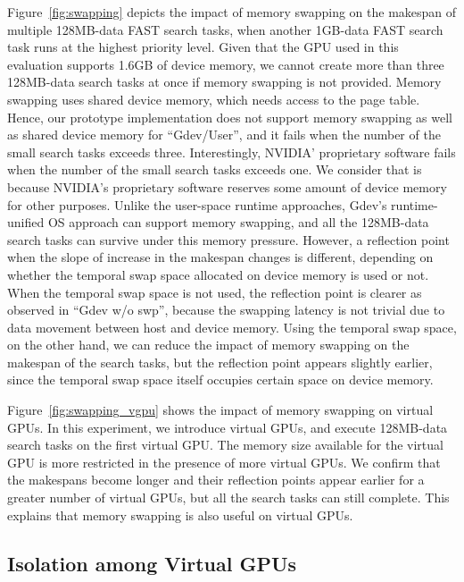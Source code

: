 Figure~\ref{fig:swapping} depicts the impact of memory swapping on the
makespan of multiple 128MB-data FAST search tasks, when another 1GB-data
FAST search task runs at the highest priority level. 
Given that the GPU used in this evaluation supports 1.6GB of device
memory, we cannot create more than three 128MB-data search tasks at once
if memory swapping is not provided.
Memory swapping uses shared device memory, which needs access to the
page table.
Hence, our prototype implementation does not support memory swapping as
well as shared device memory for ``Gdev/User'', and it fails when
the number of the small search tasks exceeds three.
Interestingly, NVIDIA' proprietary software fails when the number of the
small search tasks exceeds one.
We consider that is because NVIDIA's proprietary software reserves some
amount of device memory for other purposes.
Unlike the user-space runtime approaches, Gdev's runtime-unified OS
approach can support memory swapping, and all the 128MB-data search
tasks can survive under this memory pressure.
However, a reflection point when the slope of increase in the makespan
changes is different, depending on whether the temporal swap
space allocated on device memory is used or not.
When the temporal swap space is not used, the reflection point is
clearer as observed in ``Gdev w/o swp'', because the swapping latency is
not trivial due to data movement between host and device memory.
Using the temporal swap space, on the other hand, we can reduce the impact
of memory swapping on the makespan of the search tasks, but the
reflection point appears slightly earlier, since the temporal swap space
itself occupies certain space on device memory.

Figure~\ref{fig:swapping_vgpu} shows the impact of memory swapping on
virtual GPUs.
In this experiment, we introduce virtual GPUs, and execute 128MB-data
search tasks on the first virtual GPU.
The memory size available for the virtual GPU is more restricted in
the presence of more virtual GPUs.
We confirm that the makespans become longer and their reflection points
appear earlier for a greater number of virtual GPUs, but all the search
tasks can still complete.
This explains that memory swapping is also useful on virtual GPUs.

\vspace{-0.25em}
\subsection{Isolation among Virtual GPUs}
\vspace{-0.25em}

